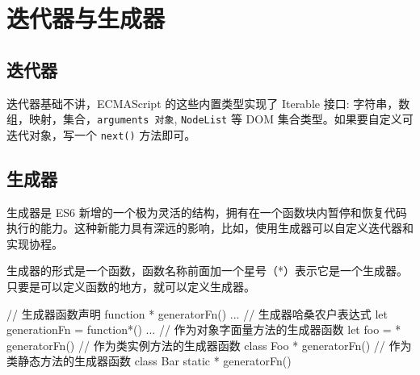 \section{迭代器与生成器}

\subsection{迭代器}

迭代器基础不讲，ECMAScript 的这些内置类型实现了 Iterable 接口: 字符串，数组，映射，集合，\texttt{arguments 对象}, \texttt{NodeList} 等 DOM 集合类型。如果要自定义可迭代对象，写一个 \texttt{next()} 方法即可。

\subsection{生成器}

生成器是 ES6 新增的一个极为灵活的结构，拥有在一个函数块内暂停和恢复代码执行的能力。这种新能力具有深远的影响，比如，使用生成器可以自定义迭代器和实现协程。

生成器的形式是一个函数，函数名称前面加一个星号（*）表示它是一个生成器。只要是可以定义函数的地方，就可以定义生成器。

\begin{JavaScript}
// 生成器函数声明
function * generatorFn() {...}
// 生成器哈桑农户表达式
let generationFn = function*() {...}
// 作为对象字面量方法的生成器函数
let foo = {    
    * generatorFn() {} 
} 
// 作为类实例方法的生成器函数
class Foo {   
    * generatorFn() {} 
} 
// 作为类静态方法的生成器函数
class Bar {   
    static * generatorFn() {} 
} 
\end{JavaScript}


